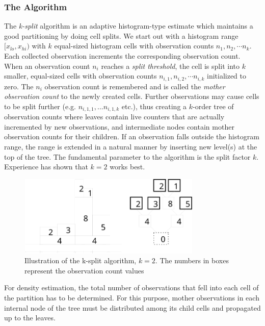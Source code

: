 \subsubsection{The Algorithm}


The \textit{k-split} algorithm is an adaptive histogram-type estimate which
maintains a good partitioning by doing cell splits. We start out with
a histogram range $[x_{lo}, x_{hi})$ with $k$ equal-sized histogram
cells with observation counts $n_1,n_2, \cdots n_k$.  Each collected
observation increments the corresponding observation count. When an
observation count $n_i$ reaches a \textit{split threshold}, the cell
is split into $k$ smaller, equal-sized cells with observation counts
$n_{i,1}, n_{i,2}, \cdots n_{i,k}$ initialized to zero. The $n_i$
observation count is remembered and is called the \textit{mother
  observation count} to the newly created cells. Further observations
may cause cells to be split further (e.g. $n_{i,1,1},...n_{i,1,k}$
etc.), thus creating a $k$-order tree of observation counts where
leaves contain live counters that are actually incremented by new
observations, and intermediate nodes contain mother observation counts
for their children. If an observation falls outside the histogram
range, the range is extended in a natural manner by inserting new
level(s) at the top of the tree. The fundamental parameter to the
algorithm is the split factor $k$. Experience has shown that $k=2$
works best.

\begin{figure}[htbp]
  \begin{center}
    \includegraphics[width=3.442in, height=1.518in]{figures/simlib-ksplit1}
    \caption{Illustration of the k-split algorithm, $k=2$. The
      numbers in boxes represent the observation count values}
  \end{center}
\end{figure}


For density estimation, the total number of observations that
fell into each cell of the partition has to be determined. For
this purpose, mother observations in each internal node of the
tree must be distributed among its child cells and propagated
up to the leaves.

